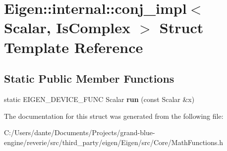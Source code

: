 \hypertarget{struct_eigen_1_1internal_1_1conj__impl}{}\section{Eigen\+::internal\+::conj\+\_\+impl$<$ Scalar, Is\+Complex $>$ Struct Template Reference}
\label{struct_eigen_1_1internal_1_1conj__impl}
\subsection*{Static Public Member Functions}
\begin{DoxyCompactItemize}
\item 
\mbox{\label{struct_eigen_1_1internal_1_1conj__impl_a45d6c8e694ad2d4fd218fe23058f862b}} 
static E\+I\+G\+E\+N\+\_\+\+D\+E\+V\+I\+C\+E\+\_\+\+F\+U\+NC Scalar {\bfseries run} (const Scalar \&x)
\end{DoxyCompactItemize}


The documentation for this struct was generated from the following file\+:\begin{DoxyCompactItemize}
\item 
C\+:/\+Users/dante/\+Documents/\+Projects/grand-\/blue-\/engine/reverie/src/third\+\_\+party/eigen/\+Eigen/src/\+Core/Math\+Functions.\+h\end{DoxyCompactItemize}
